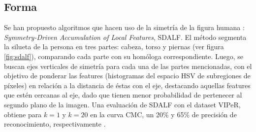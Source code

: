 \documentclass[../memoria.tex]{subfiles}
\begin{document}
\subsection{Forma}
Se han propuesto algoritmos que hacen uso de la simetría de la figura humana \cite{farenzena2010person}: \emph{Symmetry-Driven Accumulation of Local Features}, SDALF. El método segmenta la silueta de la persona en tres partes: cabeza, torso y piernas (ver figura \ref{fig:sdalf}), comparando cada parte con su homóloga correspondiente. Luego, se buscan ejes verticales de simetría para cada una de las partes mencionadas, con el objetivo de ponderar las features (histogramas del espacio HSV de subregiones de píxeles) en relación a la distancia de éstas con el eje, destacando aquellas features que estén cercanas al eje, dado que tienen menor probabilidad de pertenecer al segundo plano de la imagen. Una evaluación de SDALF con el dataset VIPeR, obtiene para $k=1$ y $k=20$ en la curva CMC, un 20\% y 65\% de precisión de reconocimiento, respectivamente \cite{farenzena2010person}. %
\end{document}
